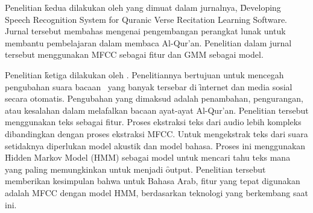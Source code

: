Penelitian \f{kedua} dilakukan oleh \cite{putra2012developing} yang dimuat dalam jurnalnya, \f{Developing Speech Recognition System for Quranic Verse Recitation Learning Software}. Jurnal tersebut membahas mengenai pengembangan perangkat lunak untuk membantu pembelajaran dalam membaca Al-Qur'an. Penelitian dalam jurnal tersebut menggunakan MFCC sebagai fitur dan GMM sebagai model.%

Penelitian \f{ketiga} dilakukan oleh \cite{mohammed2015quranic}. Penelitiannya bertujuan untuk mencegah pengubahan suara bacaan \quran~yang banyak tersebar di \f{internet} dan media sosial secara otomatis. Pengubahan yang dimaksud adalah penambahan, pengurangan, atau kesalahan dalam melafalkan bacaan ayat-ayat Al-Qur'an. Penelitian tersebut menggunakan teks sebagai fitur. Proses ekstraksi teks dari audio lebih kompleks dibandingkan dengan proses ekstraksi MFCC. Untuk mengekstrak teks dari suara setidaknya diperlukan model akustik dan model bahasa. Proses ini menggunakan \f{Hidden Markov Model} (HMM) sebagai model untuk mencari tahu teks mana yang paling memungkinkan untuk menjadi \f{output}.%
Penelitian tersebut memberikan kesimpulan bahwa untuk Bahasa Arab, fitur yang tepat digunakan adalah MFCC dengan model HMM, berdasarkan teknologi yang berkembang saat ini.